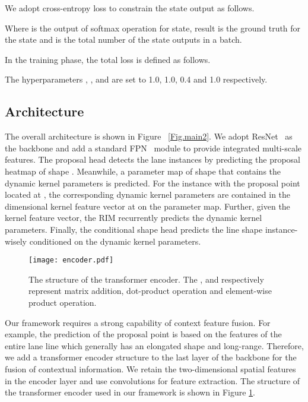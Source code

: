 \documentclass[10pt,twocolumn,letterpaper]{article}
\begin{document}
We adopt cross-entropy loss to constrain the state output as follows.



Where  is the output of softmax operation for  state, result  is the ground truth for the  state and  is the total number of the state outputs in a batch.

In the training phase, the total loss is defined as follows.


The hyperparameters , ,  and  are set to 1.0, 1.0, 0.4 and 1.0 respectively.




\subsection{Architecture}
The overall architecture is shown in Figure ~\ref{Fig.main2}. We adopt ResNet~\cite{he2016deep} as the backbone and add a standard FPN~\cite{lin2017feature} module to provide integrated multi-scale features. The proposal head detects the lane instances by predicting the proposal heatmap of shape . Meanwhile, a parameter map of shape  that contains the dynamic kernel parameters is predicted. For the instance with the proposal point located at , the corresponding dynamic kernel parameters are contained in the  dimensional kernel feature vector at  on the parameter map. Further, given the kernel feature vector, the RIM recurrently predicts the dynamic kernel parameters.
Finally, the conditional shape head predicts the line shape instance-wisely conditioned on the dynamic kernel parameters.

\begin{figure}[h]
\centering
\texttt{[image: encoder.pdf]}
\caption{The structure of the transformer encoder. The ,  and  respectively represent matrix addition, dot-product operation and element-wise product operation.} \label{Fig.encoder} \end{figure}
Our framework requires a strong capability of context feature fusion. For example, the prediction of the proposal point is based on the features of the entire lane line which generally has an elongated shape and long-range. Therefore, we add a transformer encoder structure to the last layer of the backbone for the fusion of contextual information. We retain the two-dimensional spatial features in the encoder layer and use convolutions for feature extraction. The structure of the transformer encoder used in our framework is shown in Figure \ref{Fig.encoder}.
\end{document}

